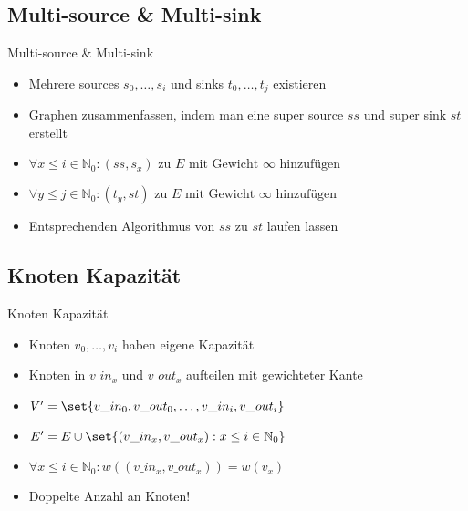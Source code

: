 \subsection{Multi-source \& Multi-sink}
\begin{frame}{Multi-source \& Multi-sink}
    \begin{itemize}
        \pause\item Mehrere sources $s_0,\dots,s_i$ und sinks $t_0,\dots,t_j$ existieren
        \pause\item Graphen zusammenfassen, indem man eine super source $ss$ und super sink
        $st$ erstellt
        \pause\item \(\forall x \leq i \in \mathbb{N}_0 : (ss, s_x) \text{ zu $E$ mit
        Gewicht $\infty$ hinzufügen}\)
        \item \(\forall y \leq j \in \mathbb{N}_0 : (t_y, st) \text{ zu $E$ mit
        Gewicht $\infty$ hinzufügen}\)
        \pause\item Entsprechenden Algorithmus von $ss$ zu $st$ laufen lassen
    \end{itemize}
\end{frame}

\subsection{Knoten Kapazität}
\begin{frame}{Knoten Kapazität}
    \begin{itemize}
        \pause\item Knoten $v_0,\dots,v_i$ haben eigene Kapazität
        \pause\item Knoten in $v\_in_x$ und $v\_out_x$ aufteilen mit gewichteter Kante
        \pause\item \(V' = \set{v\_in_0, v\_out_0, \dots, v\_in_i, v\_out_i}\)
        \pause\item \(E' = E \cup \set{(v\_in_x, v\_out_x) : x \leq i \in \mathbb{N}_0}\)
        \pause\item \(\forall x \leq i \in \mathbb{N}_0 : w((v\_in_x, v\_out_x)) = w(v_x)\)
        \pause\item Doppelte Anzahl an Knoten!
    \end{itemize}
\end{frame}

